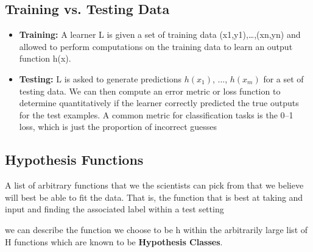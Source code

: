 \documentclass{article}
\begin{document}
    \subsection{Training vs. Testing Data}
        \begin{itemize}
            \item 
                \textbf{Training:}
                A learner {L} is given a set of training data {(x1,y1),…,(xn,yn)} and allowed to perform computations on the training data to learn an output function {h(x)}.
                
            \item 
                \textbf{Testing:}
                {L} is asked to generate predictions {$h(x_1)$, ..., $h(x_m)$} for a set of testing data. We can then compute an error metric or loss function to determine quantitatively if the learner correctly predicted the true outputs for the test examples. A common metric for classification tasks is the 0–1 loss, which is just the proportion of incorrect guesses
                
        \end{itemize}
    
    \subsection{Hypothesis Functions}
    A list of arbitrary functions that we the scientists can pick from that we believe will best be able to fit the data. That is, the function that is best at taking and input and finding the associated label within a test setting
    
    we can describe the function we choose to be h within the arbitrarily large list of H functions which are known to be \textbf{Hypothesis Classes}.
    
\end{document}
